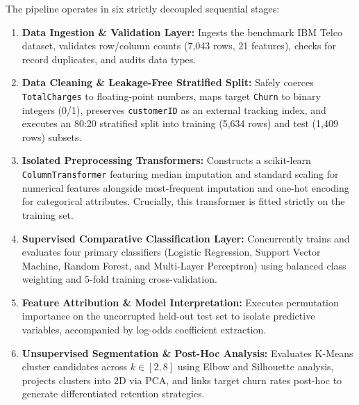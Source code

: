 \documentclass[12pt,a4paper]{report}
\newcommand{\datasetTotalRows}{7,043}
\newcommand{\datasetTotalCols}{21}
\newcommand{\datasetTrainCount}{5,634}
\newcommand{\datasetTestCount}{1,409}
\begin{document}
The pipeline operates in six strictly decoupled sequential stages:
\begin{enumerate}
    \item \textbf{Data Ingestion \& Validation Layer:} Ingests the benchmark IBM Telco dataset, validates row/column counts (\datasetTotalRows{} rows, \datasetTotalCols{} features), checks for record duplicates, and audits data types.
    \item \textbf{Data Cleaning \& Leakage-Free Stratified Split:} Safely coerces \texttt{TotalCharges} to floating-point numbers, maps target \texttt{Churn} to binary integers (0/1), preserves \texttt{customerID} as an external tracking index, and executes an 80:20 stratified split into training (\datasetTrainCount{} rows) and test (\datasetTestCount{} rows) subsets.
    \item \textbf{Isolated Preprocessing Transformers:} Constructs a scikit-learn \texttt{ColumnTransformer} featuring median imputation and standard scaling for numerical features alongside most-frequent imputation and one-hot encoding for categorical attributes. Crucially, this transformer is fitted strictly on the training set.
    \item \textbf{Supervised Comparative Classification Layer:} Concurrently trains and evaluates four primary classifiers (Logistic Regression, Support Vector Machine, Random Forest, and Multi-Layer Perceptron) using balanced class weighting and 5-fold training cross-validation.
    \item \textbf{Feature Attribution \& Model Interpretation:} Executes permutation importance on the uncorrupted held-out test set to isolate predictive variables, accompanied by log-odds coefficient extraction.
    \item \textbf{Unsupervised Segmentation \& Post-Hoc Analysis:} Evaluates K-Means cluster candidates across $k \in [2, 8]$ using Elbow and Silhouette analysis, projects clusters into 2D via PCA, and links target churn rates post-hoc to generate differentiated retention strategies.
\end{enumerate}
\end{document}
